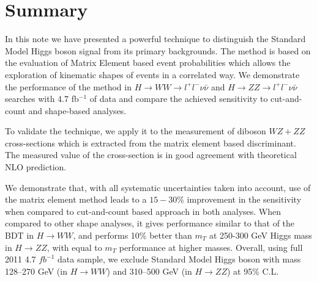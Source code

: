 \documentclass{cmspaper}
\begin{document}
\section{Summary}
In this note we have presented a powerful technique to distinguish the Standard Model Higgs boson signal
from its primary backgrounds. The method is based on the evaluation of Matrix Element based event probabilities 
which allows the exploration of kinematic shapes of events in a correlated way. We demonstrate the
performance of the method in $H \rightarrow WW \rightarrow l^{+}l^{-}\nu\bar{\nu}$ and $H \rightarrow ZZ \rightarrow l^{+}l^{-}\nu\bar{\nu}$ searches with 4.7 fb$^{-1}$ of data and compare the achieved sensitivity to cut-and-count and shape-based analyses.  

To validate the technique, we apply it to the measurement of diboson $WZ+ZZ$ cross-sections which is extracted from
the matrix element based discriminant. The measured value of the cross-section is in good agreement with theoretical NLO prediction.

We demonstrate that, with all systematic uncertainties taken into account, use of the matrix element method 
leads to a $15-30 \%$ improvement in the sensitivity when compared to cut-and-count based approach in both analyses. 
When compared to other shape analyses, it gives performance similar to that of the BDT in $H\rightarrow WW$, and performs 10\% better 
than $m_{T}$ at 250-300 GeV Higgs mass in $H\rightarrow ZZ$, with equal to $m_{T}$ performance at higher masses. 
Overall, using full 2011 4.7 $fb^{-1}$ data sample, we exclude Standard Model Higgs boson with 
mass 128--270 GeV (in $H\rightarrow WW$) and 310--500 GeV (in $H\rightarrow ZZ$) at 95\% C.L.

 
\end{document}
